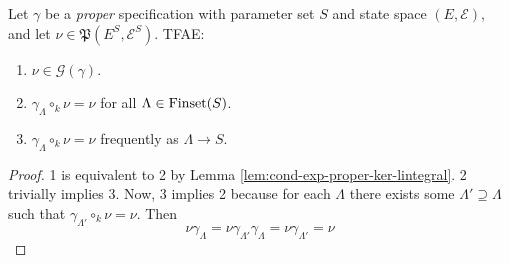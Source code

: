 \begin{lemma}
    \label{lem:gibbs-meas-tfae}
    \leanok

    Let $\gamma$ be a {\it proper} specification with parameter set $S$ and state space $(E, \mathcal{E})$, and let $\nu\in\mathfrak{P}(E^S, \mathcal{E}^S)$. TFAE:
    \begin{enumerate}
        \item $\nu\in\mathcal{G}(\gamma)$.
        \item $\gamma_\Lambda\circ_k\nu = \nu$ for all $\Lambda\in\operatorname{Finset}(S)$.
        \item $\gamma_\Lambda\circ_k\nu = \nu$ frequently as $\Lambda \to S$.
    \end{enumerate}
\end{lemma}
\begin{proof}
    \leanok

    1 is equivalent to 2 by Lemma \ref{lem:cond-exp-proper-ker-lintegral}. 2 trivially implies 3. Now, 3 implies 2 because for each $\Lambda$ there exists some $\Lambda' \supseteq \Lambda$ such that
    $\gamma_{\Lambda'}\circ_k\nu = \nu$. Then
    $$\nu\gamma_\Lambda = \nu\gamma_{\Lambda'}\gamma_\Lambda = \nu\gamma_{\Lambda'} = \nu$$
\end{proof}
